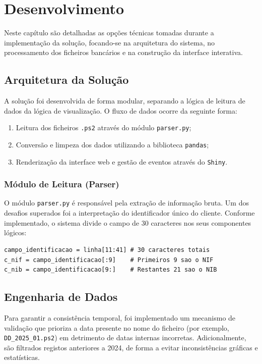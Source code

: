 \chapter {Desenvolvimento}

Neste capítulo são detalhadas as opções técnicas tomadas durante a implementação da solução, focando-se na arquitetura do sistema, no processamento dos ficheiros bancários e na construção da interface interativa.

\section {Arquitetura da Solução}
A solução foi desenvolvida de forma modular, separando a lógica de leitura de dados da lógica de visualização. O fluxo de dados ocorre da seguinte forma:
\begin{enumerate}
    \item Leitura dos ficheiros \texttt{.ps2} através do módulo \texttt{parser.py};
    \item Conversão e limpeza dos dados utilizando a biblioteca \texttt{pandas};
    \item Renderização da interface web e gestão de eventos através do \texttt{Shiny}.
\end{enumerate}

\subsection{Módulo de Leitura (Parser)}
O módulo \texttt{parser.py} é responsável pela extração de informação bruta. Um dos desafios superados foi a interpretação do identificador único do cliente.  
Conforme implementado, o sistema divide o campo de 30 caracteres nos seus componentes lógicos:

\begin{verbatim}
campo_identificacao = linha[11:41] # 30 caracteres totais
c_nif = campo_identificacao[:9]    # Primeiros 9 sao o NIF
c_nib = campo_identificacao[9:]    # Restantes 21 sao o NIB
\end{verbatim}

\section{Engenharia de Dados}
Para garantir a consistência temporal, foi implementado um mecanismo de validação que prioriza a data presente no nome do ficheiro (por exemplo, \verb|DD_2025_01.ps2|) em detrimento de datas internas incorretas.  
Adicionalmente, são filtrados registos anteriores a 2024, de forma a evitar inconsistências gráficas e estatísticas.

